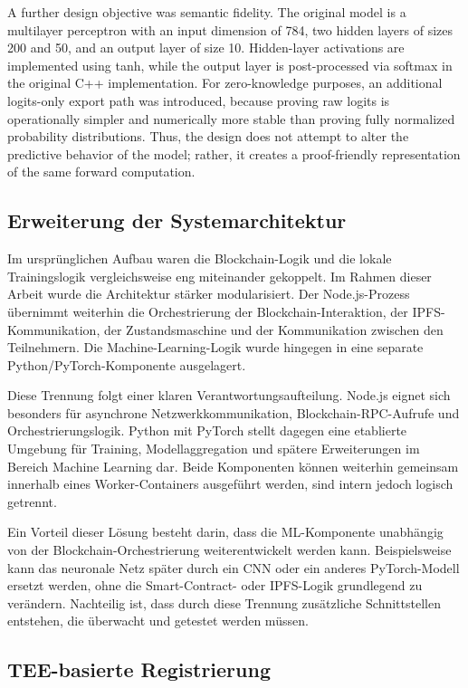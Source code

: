 A further design objective was semantic fidelity. The original model is a multilayer perceptron with an input dimension of 784, two hidden layers of sizes 200 and 50, and an output layer of size 10. Hidden-layer activations are implemented using tanh, while the output layer is post-processed via softmax in the original C++ implementation. For zero-knowledge purposes, an additional logits-only export path was introduced, because proving raw logits is operationally simpler and numerically more stable than proving fully normalized probability distributions. Thus, the design does not attempt to alter the predictive behavior of the model; rather, it creates a proof-friendly representation of the same forward computation.

\subsection{Erweiterung der Systemarchitektur}

Im ursprünglichen Aufbau waren die Blockchain-Logik und die lokale Trainingslogik vergleichsweise eng miteinander gekoppelt. Im Rahmen dieser Arbeit wurde die Architektur stärker modularisiert. Der Node.js-Prozess übernimmt weiterhin die Orchestrierung der Blockchain-Interaktion, der IPFS-Kommunikation, der Zustandsmaschine und der Kommunikation zwischen den Teilnehmern. Die Machine-Learning-Logik wurde hingegen in eine separate Python/PyTorch-Komponente ausgelagert.

Diese Trennung folgt einer klaren Verantwortungsaufteilung. Node.js eignet sich besonders für asynchrone Netzwerkkommunikation, Blockchain-RPC-Aufrufe und Orchestrierungslogik. Python mit PyTorch stellt dagegen eine etablierte Umgebung für Training, Modellaggregation und spätere Erweiterungen im Bereich Machine Learning dar. Beide Komponenten können weiterhin gemeinsam innerhalb eines Worker-Containers ausgeführt werden, sind intern jedoch logisch getrennt.

Ein Vorteil dieser Lösung besteht darin, dass die ML-Komponente unabhängig von der Blockchain-Orchestrierung weiterentwickelt werden kann. Beispielsweise kann das neuronale Netz später durch ein CNN oder ein anderes PyTorch-Modell ersetzt werden, ohne die Smart-Contract- oder IPFS-Logik grundlegend zu verändern. Nachteilig ist, dass durch diese Trennung zusätzliche Schnittstellen entstehen, die überwacht und getestet werden müssen.

\subsection{TEE-basierte Registrierung}

